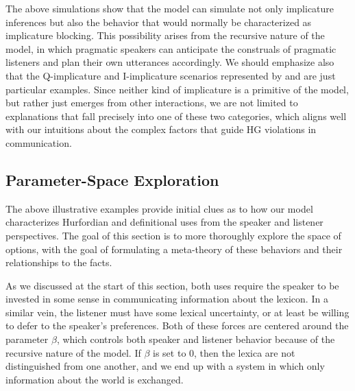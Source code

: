 \documentclass[12pt,twoside]{article}
\renewcommand{\_}{\textbf{\textunderscore\hspace{-4pt}\textunderscore\hspace{-3pt}\textunderscore\hspace{-4pt}\textunderscore}\hspace{0.5pt}}			%
\begin{document}
The above simulations show that the model can simulate not only
implicature inferences but also the behavior that would normally be
characterized as implicature blocking. This possibility arises from
the recursive nature of the model, in which pragmatic speakers can
anticipate the construals of pragmatic listeners and plan their own
utterances accordingly. We should emphasize also that the
Q-implicature and I-implicature scenarios represented by
 and  are just particular
examples. Since neither kind of implicature is a primitive of the
model, but rather just emerges from other interactions, we are not
limited to explanations that fall precisely into one of these two
categories, which aligns well with our intuitions about the complex
factors that guide HG violations in communication.


\subsection{Parameter-Space Exploration}\label{sec:characterization}

The above illustrative examples provide initial clues as to how our
model characterizes Hurfordian and definitional uses from the speaker
and listener perspectives. The goal of this section is to more
thoroughly explore the space of options, with the goal of formulating
a meta-theory of these behaviors and their relationships to the facts.

As we discussed at the start of this section, both uses require the
speaker to be invested in some sense in communicating information
about the lexicon.  In a similar vein, the listener must have some
lexical uncertainty, or at least be willing to defer to the speaker's
preferences. Both of these forces are centered around the parameter
$\beta$, which controls both speaker and listener behavior because of
the recursive nature of the model. If $\beta$ is set to $0$, then the
lexica are not distinguished from one another, and we end up with a
system in which only information about the world is exchanged.
\end{document}
